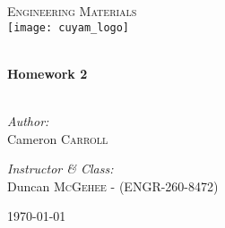 \begin{titlepage}
\begin{center}

\textsc{\Large Engineering Materials}\\[0.5cm]
\texttt{[image: cuyam\_logo]}

\HRule \\[0.4cm]
{ \LARGE \bfseries Homework 2}\\[0.5cm]

\HRule \\[1.5cm]

\begin{minipage}{0.4\textwidth}
\begin{flushleft} \large
\emph{Author:}\\
Cameron \textsc{Carroll}
\end{flushleft}
\end{minipage}
\begin{minipage}{0.4\textwidth}
\begin{flushright} \large
\emph{Instructor \& Class:}\\
Duncan \textsc{McGehee} - (ENGR-260-8472)
\end{flushright}
\end{minipage}

\vfill

{\large \today}

\end{center}
\end{titlepage}